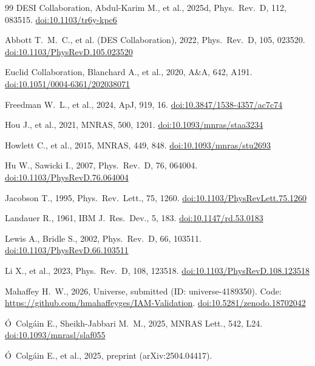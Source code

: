 \documentclass[12pt,a4paper]{article}
\newcommand{\doi}[1]{\href{https://doi.org/#1}{doi:#1}}
\begin{document}
\begin{thebibliography}{99}
{DESI Collaboration}, Abdul-Karim M., et al., 2025d, Phys.\ Rev.\ D, 112, 083515.
\newblock \doi{10.1103/tr6y-kpc6}

Abbott T.~M.~C., et al. ({DES Collaboration}), 2022, Phys.\ Rev.\ D, 105, 023520.
\newblock \doi{10.1103/PhysRevD.105.023520}

{Euclid Collaboration}, Blanchard A., et al., 2020, A\&A, 642, A191.
\newblock \doi{10.1051/0004-6361/202038071}

Freedman W.~L., et al., 2024, ApJ, 919, 16.
\newblock \doi{10.3847/1538-4357/ac7c74}

Hou J., et al., 2021, MNRAS, 500, 1201.
\newblock \doi{10.1093/mnras/staa3234}

Howlett C., et al., 2015, MNRAS, 449, 848.
\newblock \doi{10.1093/mnras/stu2693}

Hu W., Sawicki I., 2007, Phys.\ Rev.\ D, 76, 064004.
\newblock \doi{10.1103/PhysRevD.76.064004}

Jacobson T., 1995, Phys.\ Rev.\ Lett., 75, 1260.
\newblock \doi{10.1103/PhysRevLett.75.1260}

Landauer R., 1961, IBM J.\ Res.\ Dev., 5, 183.
\newblock \doi{10.1147/rd.53.0183}

Lewis A., Bridle S., 2002, Phys.\ Rev.\ D, 66, 103511.
\newblock \doi{10.1103/PhysRevD.66.103511}

Li X., et al., 2023, Phys.\ Rev.\ D, 108, 123518.
\newblock \doi{10.1103/PhysRevD.108.123518}

Mahaffey H.~W., 2026, Universe, submitted (ID: universe-4189350).
\newblock Code: \url{https://github.com/hmahaffeyges/IAM-Validation}.
\newblock \doi{10.5281/zenodo.18702042}

\'O~Colg\'ain E., Sheikh-Jabbari M.~M., 2025, MNRAS Lett., 542, L24.
\newblock \doi{10.1093/mnrasl/slaf055}

\'O~Colg\'ain E., et al., 2025, preprint (arXiv:2504.04417).


\end{thebibliography}
\end{document}
